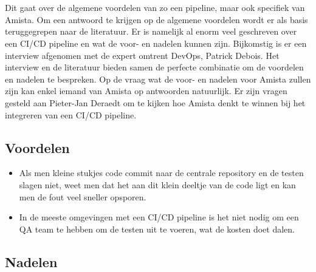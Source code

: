 
\chapter{}
\label{ch:voor-en-nadelen-cicd}
Dit gaat over de algemene voordelen van zo een pipeline, maar ook specifiek van Amista. Om een antwoord te krijgen op de algemene voordelen wordt er als basis teruggegrepen naar de literatuur. Er is namelijk al enorm veel geschreven over een CI/CD pipeline en wat de voor- en nadelen kunnen zijn.
Bijkomstig is er een interview afgenomen met de expert omtrent DevOps, Patrick Debois.
Het interview en de literatuur bieden samen de perfecte combinatie om de voordelen en nadelen te bespreken.
Op de vraag wat de voor- en nadelen voor Amista zullen zijn kan enkel iemand van Amista op antwoorden natuurlijk. Er zijn vragen gesteld aan Pieter-Jan Deraedt om te kijken hoe Amista denkt te winnen bij het integreren van een CI/CD pipeline.


\section{Voordelen}
\label{sec:voordelen}
\begin{itemize}
    \item Als men kleine stukjes code commit naar de centrale repository en de testen slagen niet, weet men dat het aan dit klein deeltje van de code ligt en kan men de fout veel sneller opsporen. %
    \item In de meeste omgevingen met een CI/CD pipeline is het niet nodig om een QA team te hebben om de testen uit te voeren, wat de kosten doet dalen.
\end{itemize}

\section{Nadelen}
\label{sec:nadelen}
